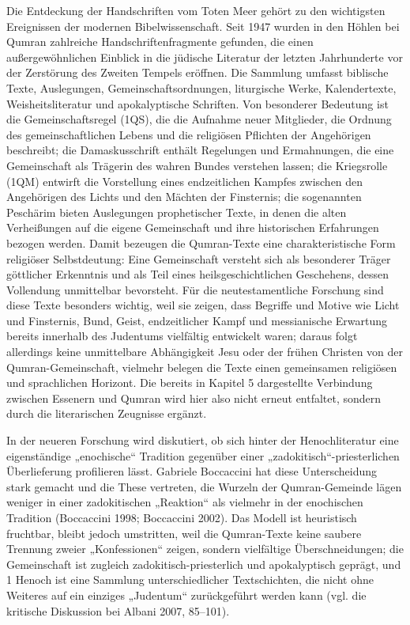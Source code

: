 \documentclass[fontsize=12pt]{mybib}
\begin{document}
Die Entdeckung der Handschriften vom Toten Meer gehört zu den wichtigsten Ereignissen der modernen Bibelwissenschaft. Seit 1947 wurden in den Höhlen bei Qumran zahlreiche Handschriftenfragmente gefunden, die einen außergewöhnlichen Einblick in die jüdische Literatur der letzten Jahrhunderte vor der Zerstörung des Zweiten Tempels eröffnen. Die Sammlung umfasst biblische Texte, Auslegungen, Gemeinschaftsordnungen, liturgische Werke, Kalendertexte, Weisheitsliteratur und apokalyptische Schriften. Von besonderer Bedeutung ist die Gemeinschaftsregel (1QS), die die Aufnahme neuer Mitglieder, die Ordnung des gemeinschaftlichen Lebens und die religiösen Pflichten der Angehörigen beschreibt; die Damaskusschrift enthält Regelungen und Ermahnungen, die eine Gemeinschaft als Trägerin des wahren Bundes verstehen lassen; die Kriegsrolle (1QM) entwirft die Vorstellung eines endzeitlichen Kampfes zwischen den Angehörigen des Lichts und den Mächten der Finsternis; die sogenannten Peschärim bieten Auslegungen prophetischer Texte, in denen die alten Verheißungen auf die eigene Gemeinschaft und ihre historischen Erfahrungen bezogen werden. Damit bezeugen die Qumran-Texte eine charakteristische Form religiöser Selbstdeutung: Eine Gemeinschaft versteht sich als besonderer Träger göttlicher Erkenntnis und als Teil eines heilsgeschichtlichen Geschehens, dessen Vollendung unmittelbar bevorsteht. Für die neutestamentliche Forschung sind diese Texte besonders wichtig, weil sie zeigen, dass Begriffe und Motive wie Licht und Finsternis, Bund, Geist, endzeitlicher Kampf und messianische Erwartung bereits innerhalb des Judentums vielfältig entwickelt waren; daraus folgt allerdings keine unmittelbare Abhängigkeit Jesu oder der frühen Christen von der Qumran-Gemeinschaft, vielmehr belegen die Texte einen gemeinsamen religiösen und sprachlichen Horizont. Die bereits in Kapitel 5 dargestellte Verbindung zwischen Essenern und Qumran wird hier also nicht erneut entfaltet, sondern durch die literarischen Zeugnisse ergänzt.

In der neueren Forschung wird diskutiert, ob sich hinter der Henochliteratur eine eigenständige „enochische“ Tradition gegenüber einer „zadokitisch“-priesterlichen Überlieferung profilieren lässt. Gabriele Boccaccini hat diese Unterscheidung stark gemacht und die These vertreten, die Wurzeln der Qumran-Gemeinde lägen weniger in einer zadokitischen „Reaktion“ als vielmehr in der enochischen Tradition (Boccaccini 1998; Boccaccini 2002). Das Modell ist heuristisch fruchtbar, bleibt jedoch umstritten, weil die Qumran-Texte keine saubere Trennung zweier „Konfessionen“ zeigen, sondern vielfältige Überschneidungen; die Gemeinschaft ist zugleich zadokitisch-priesterlich und apokalyptisch geprägt, und 1 Henoch ist eine Sammlung unterschiedlicher Textschichten, die nicht ohne Weiteres auf ein einziges „Judentum“ zurückgeführt werden kann (vgl. die kritische Diskussion bei Albani 2007, 85–101).
\end{document}

